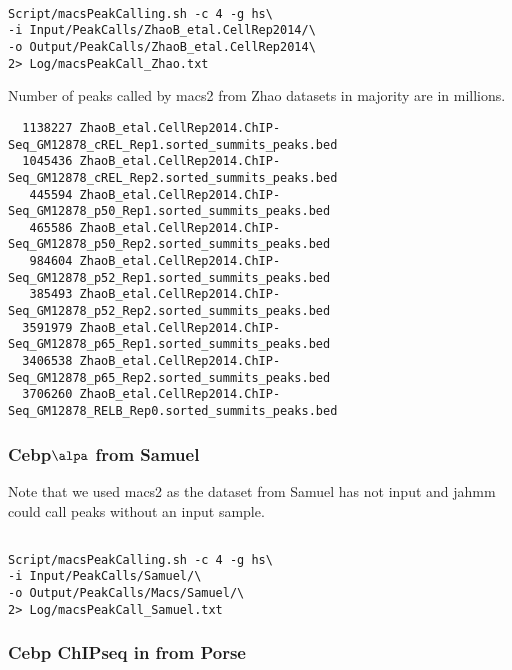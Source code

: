 \documentclass{article}\usepackage[]{graphicx}\usepackage[]{color}
\begin{document}
\begin{verbatim}

Script/macsPeakCalling.sh -c 4 -g hs\ 
-i Input/PeakCalls/ZhaoB_etal.CellRep2014/\
-o Output/PeakCalls/ZhaoB_etal.CellRep2014\ 
2> Log/macsPeakCall_Zhao.txt

\end{verbatim}

Number of peaks called by macs2 from Zhao datasets in majority are in millions. 
\begin{verbatim}
  1138227 ZhaoB_etal.CellRep2014.ChIP-Seq_GM12878_cREL_Rep1.sorted_summits_peaks.bed
  1045436 ZhaoB_etal.CellRep2014.ChIP-Seq_GM12878_cREL_Rep2.sorted_summits_peaks.bed
   445594 ZhaoB_etal.CellRep2014.ChIP-Seq_GM12878_p50_Rep1.sorted_summits_peaks.bed
   465586 ZhaoB_etal.CellRep2014.ChIP-Seq_GM12878_p50_Rep2.sorted_summits_peaks.bed
   984604 ZhaoB_etal.CellRep2014.ChIP-Seq_GM12878_p52_Rep1.sorted_summits_peaks.bed
   385493 ZhaoB_etal.CellRep2014.ChIP-Seq_GM12878_p52_Rep2.sorted_summits_peaks.bed
  3591979 ZhaoB_etal.CellRep2014.ChIP-Seq_GM12878_p65_Rep1.sorted_summits_peaks.bed
  3406538 ZhaoB_etal.CellRep2014.ChIP-Seq_GM12878_p65_Rep2.sorted_summits_peaks.bed
  3706260 ZhaoB_etal.CellRep2014.ChIP-Seq_GM12878_RELB_Rep0.sorted_summits_peaks.bed
\end{verbatim}

\subsubsection{Cebp$\alpa$ from Samuel}

Note that we used macs2 as the dataset from Samuel has not input and jahmm could call peaks without an input sample.

\begin{verbatim}

Script/macsPeakCalling.sh -c 4 -g hs\ 
-i Input/PeakCalls/Samuel/\ 
-o Output/PeakCalls/Macs/Samuel/\ 
2> Log/macsPeakCall_Samuel.txt

\end{verbatim}


\subsubsection{Cebp ChIPseq in from Porse}
\end{document}
